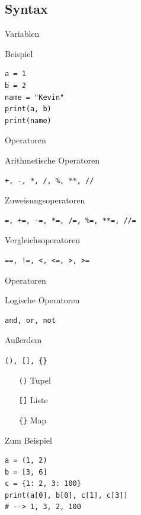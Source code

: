 \subsection{Syntax}
\begin{frame}[fragile]{Variablen}
  \begin{exampleblock}{Beispiel}
    \begin{verbatim}
a = 1
b = 2
name = "Kevin"
print(a, b)
print(name)
    \end{verbatim}
  \end{exampleblock}
\end{frame}

\begin{frame}[fragile]{Operatoren}
  \begin{block}{Arithmetische Operatoren}
  \begin{verbatim}
+, -, *, /, %, **, //
  \end{verbatim}
  \end{block}
  \begin{block}{Zuweisungsoperatoren}
  \begin{verbatim}
=, +=, -=, *=, /=, %=, **=, //=
  \end{verbatim}
  \end{block}
  \begin{block}{Vergleichsoperatoren}
  \begin{verbatim}
==, !=, <, <=, >, >=
  \end{verbatim}
  \end{block}
\end{frame}

\begin{frame}[fragile]{Operatoren}
  \begin{block}{Logische Operatoren}
  \begin{verbatim}
and, or, not
  \end{verbatim}
  \end{block}
  \begin{block}{Außerdem}
  \end{block}
\end{frame}

\begin{frame}[fragile]{\texttt{(), [], \{\}}}
  \begin{itemize}
    \item[\texttt{()}] Tupel
    \item[\texttt{[]}] Liste
    \item[\texttt{\{\}}] Map 
  \end{itemize}
  \vspace{.5em}
  \begin{spacing}{1.0}
    \begin{exampleblock}{Zum Beispiel}
      \begin{verbatim}
a = (1, 2)
b = [3, 6]
c = {1: 2, 3: 100}
print(a[0], b[0], c[1], c[3])
# --> 1, 3, 2, 100
      \end{verbatim}
    \end{exampleblock}
  \end{spacing}
\end{frame}

